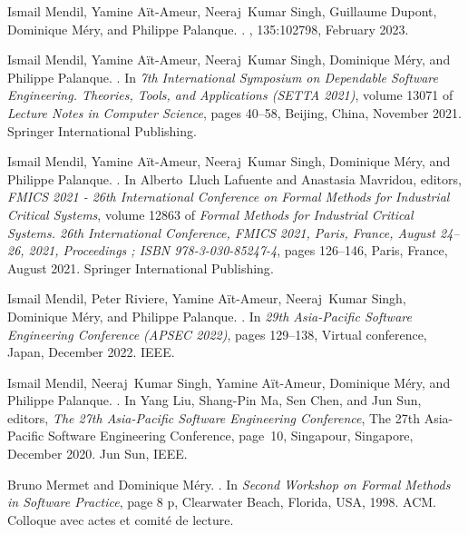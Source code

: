 \documentclass[ 12pt]{article}
\begin{document}
\begin{thebibliography}{100}
Ismail Mendil, Yamine A{\"i}t-Ameur, Neeraj~Kumar Singh, Guillaume Dupont,
  Dominique M{\'e}ry, and Philippe Palanque.
.
, 135:102798, February 2023.

Ismail Mendil, Yamine A{\"i}t-Ameur, Neeraj~Kumar Singh, Dominique M{\'e}ry,
  and Philippe Palanque.
.
\newblock In {\em {7th International Symposium on Dependable Software
  Engineering. Theories, Tools, and Applications (SETTA 2021)}}, volume 13071
  of {\em Lecture Notes in Computer Science}, pages 40--58, Beijing, China,
  November 2021. {Springer International Publishing}.

Ismail Mendil, Yamine A{\"i}t-Ameur, Neeraj~Kumar Singh, Dominique M{\'e}ry,
  and Philippe Palanque.
.
\newblock In Alberto~Lluch Lafuente and Anastasia Mavridou, editors, {\em
  {FMICS 2021 - 26th International Conference on Formal Methods for Industrial
  Critical Systems}}, volume 12863 of {\em Formal Methods for Industrial
  Critical Systems. 26th International Conference, FMICS 2021, Paris, France,
  August 24--26, 2021, Proceedings ; ISBN 978-3-030-85247-4}, pages 126--146,
  Paris, France, August 2021. {Springer International Publishing}.

Ismail Mendil, Peter Riviere, Yamine A{\"i}t-Ameur, Neeraj~Kumar Singh,
  Dominique M{\'e}ry, and Philippe Palanque.
.
\newblock In {\em {29th Asia-Pacific Software Engineering Conference (APSEC
  2022)}}, pages 129--138, Virtual conference, Japan, December 2022. {IEEE}.

Ismail Mendil, Neeraj~Kumar Singh, Yamine A{\"i}t-Ameur, Dominique M{\'e}ry,
  and Philippe Palanque.
.
\newblock In Yang Liu, Shang-Pin Ma, Sen Chen, and Jun Sun, editors, {\em {The
  27th Asia-Pacific Software Engineering Conference}}, The 27th Asia-Pacific
  Software Engineering Conference, page~10, Singapour, Singapore, December
  2020. {Jun Sun}, {IEEE}.

Bruno Mermet and Dominique M{\'e}ry.
.
\newblock In {\em {Second Workshop on Formal Methods in Software Practice}},
  page 8 p, Clearwater Beach, Florida, USA, 1998. {ACM}.
\newblock Colloque avec actes et comit{\'e} de lecture.


\end{thebibliography}
\end{document}
